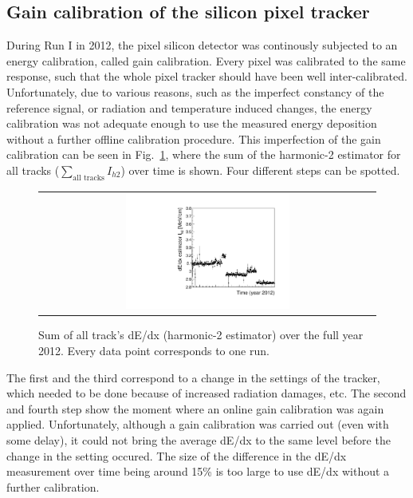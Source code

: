 \subsection{Gain calibration of the silicon pixel tracker}

During Run I in 2012, the pixel silicon detector was continously subjected to an energy calibration, called gain calibration.
Every pixel was calibrated to the same response, such that the whole pixel tracker should have been well inter-calibrated.
Unfortunately, due to various reasons, such as the imperfect constancy of the reference signal, or radiation and temperature induced changes, the energy calibration was not adequate enough to use the measured energy deposition without a further offline calibration procedure.
This imperfection of the gain calibration can be seen in Fig.~\ref{fig:StabilityPlot_beforeCalibration}, where the sum of the harmonic-2 estimator for all tracks ($\sum_{\text{all tracks}}I_{h2}$) over time is shown.
Four different steps can be spotted. 
\begin{figure}[!b]
  \centering 
  \begin{tabular}{c}
  \includegraphics[width=0.5\textwidth]{figures/analysis/StabilityPlot_Pixel_beforeCalibration_withoutStepFits_NEW.pdf}
  \end{tabular}
  \caption{Sum of all track's dE/dx (harmonic-2 estimator) over the full year 2012. Every data point corresponds to one run.} 
  \label{fig:StabilityPlot_beforeCalibration}
\end{figure}
The first and the third correspond to a change in the settings of the tracker, which needed to be done because of increased radiation damages, etc.
The second and fourth step show the moment where an online gain calibration was again applied.
Unfortunately, although a gain calibration was carried out (even with some delay), it could not bring the average dE/dx to the same level before the change in the setting occured.
The size of the difference in the dE/dx measurement over time being around 15\% is too large to use dE/dx without a further calibration.

